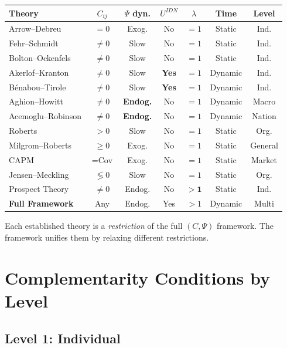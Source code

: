 \documentclass[12pt,a4paper]{article}
\begin{document}
\begin{center}
\renewcommand{\arraystretch}{1.3}
\small
\begin{tabular}{lcccccc}
\hline
\textbf{Theory} & $C_{ij}$ & $\Psi$ dyn. & $U^{IDN}$ & $\lambda$ & Time & Level \\
\hline
Arrow--Debreu & $= 0$ & Exog. & No & $= 1$ & Static & Ind. \\
Fehr--Schmidt & $\neq 0$ & Slow & No & $= 1$ & Static & Ind. \\
Bolton--Ockenfels & $\neq 0$ & Slow & No & $= 1$ & Static & Ind. \\
Akerlof--Kranton & $\neq 0$ & Slow & \textbf{Yes} & $= 1$ & Dynamic & Ind. \\
Bénabou--Tirole & $\neq 0$ & Slow & \textbf{Yes} & $= 1$ & Dynamic & Ind. \\
Aghion--Howitt & $\neq 0$ & \textbf{Endog.} & No & $= 1$ & Dynamic & Macro \\
Acemoglu--Robinson & $\neq 0$ & \textbf{Endog.} & No & $= 1$ & Dynamic & Nation \\
Roberts & $> 0$ & Slow & No & $= 1$ & Static & Org. \\
Milgrom--Roberts & $\geq 0$ & Exog. & No & $= 1$ & Static & General \\
CAPM & $= \text{Cov}$ & Exog. & No & $= 1$ & Static & Market \\
Jensen--Meckling & $\lessgtr 0$ & Slow & No & $= 1$ & Static & Org. \\
Prospect Theory & $\neq 0$ & Endog. & No & $\mathbf{> 1}$ & Static & Ind. \\
\hline
\textbf{Full Framework} & Any & Endog. & Yes & $> 1$ & Dynamic & Multi \\
\hline
\end{tabular}
\end{center}

Each established theory is a \emph{restriction} of the full $(C, \Psi)$ framework.
The framework unifies them by relaxing different restrictions.
\section{Complementarity Conditions by Level}
\label{app:levels}

\subsection{Level 1: Individual}
\end{document}
